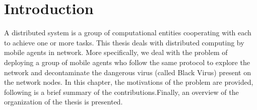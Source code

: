 \chapter {Introduction}
\label{INTRO}

  A distributed system is a group of computational entities cooperating with each to achieve one or more tasks. This thesis deals with distributed computing by mobile agents in network. More specifically, we deal with the problem of deploying a group of mobile agents who follow the same protocol to explore the network and decontaminate the dangerous virus (called Black Virus) present on the network nodes.
  In this chapter, the motivations of the problem are provided, following is a brief summary of the contributions.Finally, an overview of the organization of the thesis is presented.


